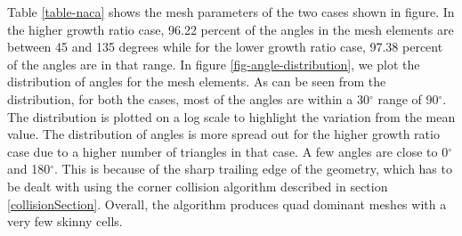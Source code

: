 \documentclass[conf]{new-aiaa}
\begin{document}
Table \ref{table-naca} shows the mesh parameters of the two cases shown in figure. In the higher growth ratio case, 96.22 percent of the angles in the mesh elements are between 45 and 135 degrees while for the lower growth ratio case, 97.38 percent of the angles are in that range. In figure \ref{fig-angle-distribution}, we plot the distribution of angles for the mesh elements. As can be seen from the distribution, for both the cases, most of the angles are within a 30$^\circ$ range of 90$^\circ$. The distribution is plotted on a log scale to highlight the variation from the mean value. The distribution of angles is more spread out for the higher growth ratio case due to a higher number of triangles in that case. A few angles are close to 0$^\circ$ and 180$^\circ$. This is because of the sharp trailing edge of the geometry, which has to be dealt with using the corner collision algorithm described in section \ref{collisionSection}. Overall, the algorithm produces quad dominant meshes with a very few skinny cells.
\end{document}
